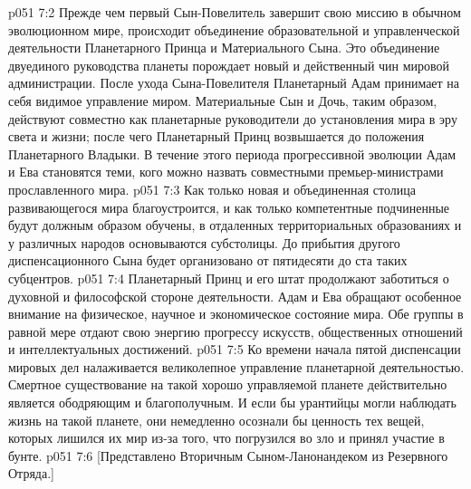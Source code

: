 \vs p051 7:2 Прежде чем первый Сын\hyp{}Повелитель завершит свою миссию в обычном эволюционном мире, происходит объединение образовательной и управленческой деятельности Планетарного Принца и Материального Сына. Это объединение двуединого руководства планеты порождает новый и действенный чин мировой администрации. После ухода Сына\hyp{}Повелителя Планетарный Адам принимает на себя видимое управление миром. Материальные Сын и Дочь, таким образом, действуют совместно как планетарные руководители до установления мира в эру света и жизни; после чего Планетарный Принц возвышается до положения Планетарного Владыки. В течение этого периода прогрессивной эволюции Адам и Ева становятся теми, кого можно назвать совместными премьер\hyp{}министрами прославленного мира.
\vs p051 7:3 Как только новая и объединенная столица развивающегося мира благоустроится, и как только компетентные подчиненные будут должным образом обучены, в отдаленных территориальных образованиях и у различных народов основываются субстолицы. До прибытия другого диспенсационного Сына будет организовано от пятидесяти до ста таких субцентров.
\vs p051 7:4 Планетарный Принц и его штат продолжают заботиться о духовной и философской стороне деятельности. Адам и Ева обращают особенное внимание на физическое, научное и экономическое состояние мира. Обе группы в равной мере отдают свою энергию прогрессу искусств, общественных отношений и интеллектуальных достижений.
\vs p051 7:5 Ко времени начала пятой диспенсации мировых дел налаживается великолепное управление планетарной деятельностью. Смертное существование на такой хорошо управляемой планете действительно является ободряющим и благополучным. И если бы урантийцы могли наблюдать жизнь на такой планете, они немедленно осознали бы ценность тех вещей, которых лишился их мир из\hyp{}за того, что погрузился во зло и принял участие в бунте.
\vsetoff
\vs p051 7:6 [Представлено Вторичным Сыном\hyp{}Ланонандеком из Резервного Отряда.]
